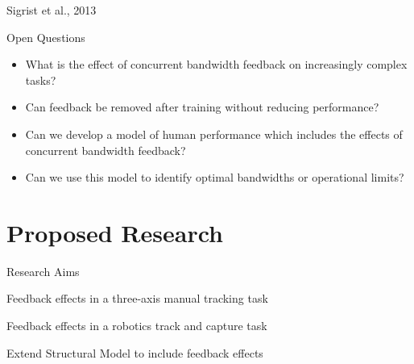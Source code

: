 \documentclass[10pt]{beamer}
\begin{document}
\begin{frame}[fragile]{Sigrist et al., 2013~\cite{Sigrist2013}}
  \begin{center}
  \end{center}
\end{frame}

\begin{frame}[fragile]{Open Questions}
  \begin{itemize}
    \setlength\itemsep{1em}
    \item What is the effect of concurrent bandwidth feedback on increasingly complex tasks?
    \item Can feedback be removed after training without reducing performance?
    \item Can we develop a model of human performance which includes the effects of concurrent bandwidth feedback?
    \item Can we use this model to identify optimal bandwidths or operational limits?
  \end{itemize}
\end{frame}

\section{Proposed Research}

\begin{frame}[fragile]{Research Aims}
  \begin{description}[align=right]
    \setlength\itemsep{1em}
    \item [Aim One] Feedback effects in a three-axis manual tracking task
    \item [Aim Two] Feedback effects in a robotics track and capture task
    \item [Aim Three] Extend Structural Model to include feedback effects
  \end{description}
\end{frame}
\end{document}
